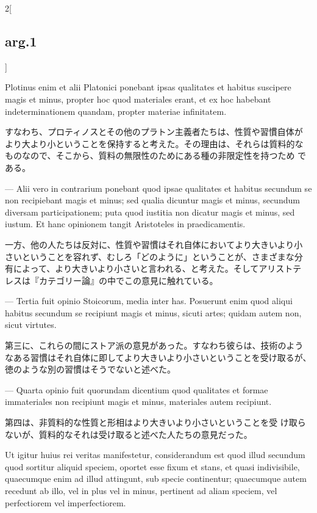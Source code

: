\documentclass[paper=a4paper,fontsize=10pt,jafontsize=9pt,titlepage]{jlreq}
\begin{document}
\begin{paracol}{2}[\subsection{arg.1}]
\switchcolumn*

Plotinus enim et alii Platonici ponebant ipsas
qualitates et habitus suscipere magis et minus, propter hoc quod
materiales erant, et ex hoc habebant indeterminationem quandam,
propter materiae infinitatem.

\switchcolumn

すなわち、プロティノスとその他のプラトン主義者たちは、性質や習慣自体が
より大より小ということを保持すると考えた。その理由は、それらは質料的な
 ものなので、そこから、質料の無限性のためにある種の非限定性を持つため
 である。

\switchcolumn*

--- Alii vero in contrarium ponebant quod
ipsae qualitates et habitus secundum se non recipiebant magis et
minus; sed qualia dicuntur magis et minus, secundum diversam
participationem; puta quod iustitia non dicatur magis et minus, sed
iustum. Et hanc opinionem tangit Aristoteles in praedicamentis.

\switchcolumn

一方、他の人たちは反対に、性質や習慣はそれ自体においてより大きいより小
さいということを容れず、むしろ「どのように」ということが、さまざまな分
有によって、より大きいより小さいと言われる、と考えた。そしてアリストテ
レスは『カテゴリー論』の中でこの意見に触れている。

\switchcolumn*

--- Tertia
fuit opinio Stoicorum, media inter has. Posuerunt enim quod aliqui
habitus secundum se recipiunt magis et minus, sicuti artes; quidam
autem non, sicut virtutes.

\switchcolumn

第三に、これらの間にストア派の意見があった。すなわち彼らは、技術のよう
なある習慣はそれ自体に即してより大きいより小さいということを受け取るが、
徳のような別の習慣はそうでないと述べた。

\switchcolumn*

--- Quarta opinio fuit quorundam dicentium quod
qualitates et formae immateriales non recipiunt magis et minus,
materiales autem recipiunt.

\switchcolumn

第四は、非質料的な性質と形相はより大きいより小さいということを受
け取らないが、質料的なそれは受け取ると述べた人たちの意見だった。

\switchcolumn*

Ut igitur huius rei veritas manifestetur, considerandum est quod illud
secundum quod sortitur aliquid speciem, oportet esse fixum et stans,
et quasi indivisibile, quaecumque enim ad illud attingunt, sub specie
continentur; quaecumque autem recedunt ab illo, vel in plus vel in
minus, pertinent ad aliam speciem, vel perfectiorem vel
imperfectiorem.


\end{paracol}
\end{document}
